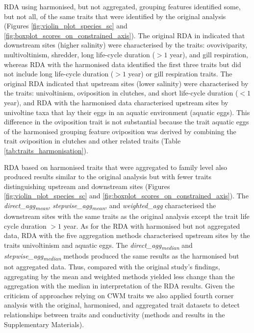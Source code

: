 \documentclass[12pt]{article}
\begin{document}
RDA using harmonised, but not aggregated, grouping features identified some, but not all, of the same traits that were identified by the original analysis (Figures \ref{fig:violin_plot_species_sc} and \ref{fig:boxplot_scores_on_constrained_axis}). The original RDA in \citet{szocs_effects_2014} indicated that downstream sites (higher salinity) were characterised by the traits: ovoviviparity, multivoltinism, shredder, long life-cycle duration ($> 1$ year), and gill respiration, whereas RDA with the harmonised data identified the first three traits but did not include long life-cycle duration ($> 1$ year) or gill respiration traits. The original RDA indicated that upstream sites (lower salinity) were characterised by the traits: univoltinism, oviposition in clutches, and short life-cycle duration ($< 1$ year), and RDA with the harmonised data characterised upstream sites by univoltine taxa that lay their eggs in an aquatic environment (aquatic eggs). This difference in the oviposition trait is not substantial because the trait aquatic eggs of the harmonised grouping feature oviposition was derived by combining the trait oviposition in clutches and other related traits (Table \ref{tab:traits_harmonisation}).

RDA based on harmonised traits that were aggregated to family level also produced results similar to the original analysis but with fewer traits distinguishing upstream and downstream sites (Figures \ref{fig:violin_plot_species_sc} and \ref{fig:boxplot_scores_on_constrained_axis}). The \textit{direct\_agg\textsubscript{mean}}, \textit{stepwise\_agg\textsubscript{mean}}, and \textit{weighted\_agg} characterised the downstream sites with the same traits as the original analysis except the trait life cycle duration $> 1$ year. As for the RDA with harmonised but not aggregated data, RDA with the five aggregation methods characterised upstream sites by the traits univoltinism and aquatic eggs. The \textit{direct\_agg\textsubscript{median}} and \textit{stepwise\_agg\textsubscript{median}} methods produced the same results as the harmonised but not aggregated data. Thus, compared with the original study’s findings, aggregating by the mean and weighted methods yielded less change than the aggregation with the median in interpretation of the RDA results. Given the criticism of approaches relying on CWM traits we also applied fourth corner analysis with the original, harmonised, and aggregated trait datasets to detect relationships between traits and conductivity (methods and results in the Supplementary Materials).
\end{document}
